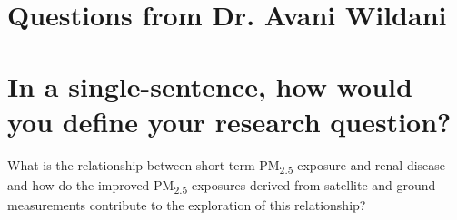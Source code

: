 \documentclass[11pt]{article}
\newcommand{\tsub}{\textsubscript}
\begin{document}

\setcounter{section}{0}

\section*{Questions from Dr. Avani Wildani}

\section{In a single-sentence, how would you define your research question?}
What is the relationship between short-term PM\tsub{2.5} exposure and renal disease and how do the improved PM\tsub{2.5} exposures derived from satellite and ground measurements contribute to the exploration of this relationship? 
\end{document}
